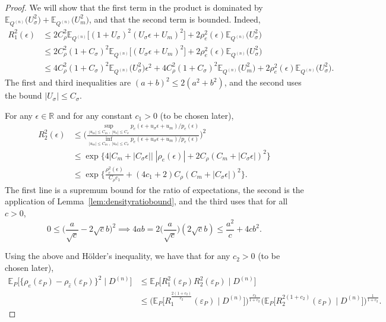 \documentclass[aos]{imsart}
\newcommand{\R}{\mathbb{R}}
\newcommand{\E}{\mathbb{E}}
\begin{document}
\begin{proof}
		We will show that the first term in the product is dominated by $\E_{Q^{(n)}}\big(U_\sigma^2\big) + \E_{Q^{(n)}}\big(U_m^2\big)$, and that the second term is bounded. Indeed,
		\begin{align*}
			R_1^2(\epsilon) &\leq 2C_\rho^2 \E_{Q^{(n)}} \big[(1+U_\sigma)^2( U_\sigma\epsilon + U_m)^2\big] + 2\rho_{e}^2(\epsilon)\E_{Q^{(n)}}\big(U_\sigma^2\big)\\
			&\leq 2C_\rho^2(1+C_\sigma)^2 \E_{Q^{(n)}} \big[( U_\sigma\epsilon + U_m)^2\big] + 2\rho_{e}^2(\epsilon)\E_{Q^{(n)}}\big(U_\sigma^2\big)\\
			&\leq  4C_\rho^2(1+C_\sigma)^2 \E_{Q^{(n)}} \big( U_\sigma^2\big)\epsilon^2 + 4C_\rho^2(1+C_\sigma)^2 \E_{Q^{(n)}} \big(U_m^2\big) + 2\rho_{e}^2(\epsilon)\E_{Q^{(n)}}\big(U_\sigma^2\big).
		\end{align*}
		The first and third inequalities are $(a+b)^2\leq 2(a^2+b^2)$, and the second uses the bound $|U_\sigma|\leq C_\sigma$.
		
		For any $\epsilon\in\R$ %
		and for any constant $c_1>0$ (to be chosen later),
		\begin{align*}
			R_2^2(\epsilon) &\leq \bigg(\frac{\sup_{|u_m|\leq C_m\;, \; |u_\sigma|\leq C_\sigma} p_{e}(\epsilon+u_\sigma \epsilon + u_m) / p_{e}(\epsilon)}{\inf_{|u_m|\leq C_m\;, \; |u_\sigma|\leq C_\sigma} p_{e}(\epsilon+u_\sigma \epsilon + u_m) / p_{e}(\epsilon)}\bigg)^2\\
			&\leq \exp\big\{4|C_m+|C_\sigma\epsilon|| \;|\rho_{e}(\epsilon)| + 2C_\rho(C_m+|C_\sigma\epsilon|)^2\big\}\\
			&\leq \exp\bigg\{ \frac{\rho_{e}^2(\epsilon)}{C_\rho c_1} + (4c_1+2)C_\rho(C_m+|C_\sigma\epsilon|)^2\bigg\}.
		\end{align*}
		The first line is a supremum bound for the ratio of expectations, the second is the application of Lemma~\ref{lem:densityratiobound}, and the third uses that for all $c>0$,
		\begin{equation*}
			0\leq \bigg(\frac{a}{\sqrt{c}} - 2\sqrt{c}b \bigg)^2 \implies 4ab = 2\bigg(\frac{a}{\sqrt{c}}\bigg)(2\sqrt{c}b) \leq \frac{a^2}{c} + 4cb^2.
		\end{equation*}
		
		Using the above and H\"older's inequality, we have that for any $c_2>0$ (to be chosen later),
		\begin{align*}
			\E_P\Big[\big\{\rho_{e}(\varepsilon_P)-\rho_{\hat\varepsilon}(\varepsilon_P)\big\}^2 \; \Big| \; D^{(n)}\Big] &\leq \E_P\big[R_1^2(\varepsilon_P)R_2^2(\varepsilon_P) \; \big| \; D^{(n)}\big]\\
			&\leq \bigg(\E_P\bigg[R_1^{\frac{2(1+c_2)}{c_2}}(\varepsilon_P)  \; \bigg| \; D^{(n)} \bigg]\bigg)^{\frac{c_2}{1+c_2}} \Big(\E_P\big[R_2^{2(1+c_2)}(\varepsilon_P)  \; \big| \; D^{(n)} \big]\Big)^{\frac1{1+c_2}}.
		\end{align*}
		

\end{proof}
\end{document}
